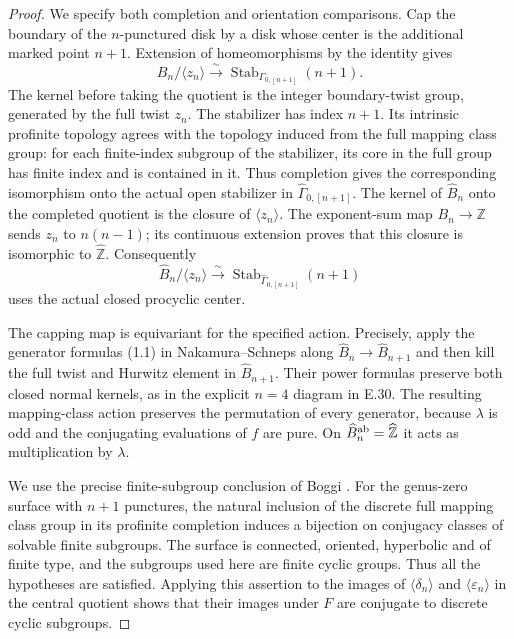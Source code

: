 \begin{proof}
We specify both completion and orientation comparisons.
Cap the boundary of the $n$-punctured disk by a disk
whose center is the additional marked point $n+1$.
Extension of homeomorphisms by the identity gives
\[
 B_n/\langle z_n\rangle
       \xrightarrow{\sim}
 \operatorname{Stab}_{\Gamma_{0,[n+1]}}(n+1).
 \tag{E.39.4}
\]
The kernel before taking the quotient is the integer
boundary-twist group, generated by the full twist $z_n$.
The stabilizer has index $n+1$.  Its intrinsic profinite
topology agrees with the topology induced from the full
mapping class group: for each finite-index subgroup of
the stabilizer, its core in the full group has finite
index and is contained in it.  Thus completion gives
the corresponding isomorphism onto the actual open
stabilizer in $\widehat\Gamma_{0,[n+1]}$.
The kernel of $\widehat B_n$ onto the completed quotient
is the closure of $\langle z_n\rangle$.  The exponent-sum
map $B_n\to\mathbb Z$ sends $z_n$ to $n(n-1)$;
its continuous extension proves that this closure is
isomorphic to $\widehat{\mathbb Z}$.
Consequently
\[
 \widehat B_n/\langle z_n\rangle
       \xrightarrow{\sim}
 \operatorname{Stab}_{\widehat\Gamma_{0,[n+1]}}(n+1)
 \tag{E.39.5}
\]
uses the actual closed procyclic center.

The capping map is equivariant for the specified action.
Precisely, apply the generator formulas (1.1) in
Nakamura--Schneps \cite{BCNakamuraSchneps2000}
along $\widehat B_n\to\widehat B_{n+1}$ and then kill
the full twist and Hurwitz element in $\widehat B_{n+1}$.
Their power formulas preserve both closed normal kernels,
as in the explicit $n=4$ diagram in E.30.
The resulting mapping-class action preserves the
permutation of every generator, because $\lambda$ is
odd and the conjugating evaluations of $f$ are pure.
On $\widehat B_n^{\rm ab}=\widehat{\mathbb Z}$ it acts
as multiplication by $\lambda$.

We use the precise finite-subgroup conclusion of
Boggi \cite[Theorem C(i), equivalently Theorem 5.1(i)
with empty boundary]{ERootBoggi2026}.  For the genus-zero
surface with $n+1$ punctures, the natural inclusion of
the discrete full mapping class group in its profinite
completion induces a bijection on conjugacy classes
of solvable finite subgroups.  The surface is connected,
oriented, hyperbolic and of finite type, and the subgroups
used here are finite cyclic groups.  Thus all the hypotheses
are satisfied.  Applying this assertion to the images
of $\langle\delta_n\rangle$ and
$\langle\varepsilon_n\rangle$ in the central quotient
shows that their images under $F$ are conjugate to
discrete cyclic subgroups.


\end{proof}

